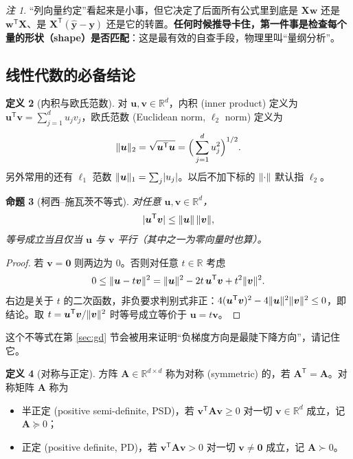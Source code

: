 \documentclass[UTF8,a4paper,11pt]{ctexart}
\theoremstyle{definition}
\newtheorem{definition}{定义}[section]
\theoremstyle{plain}
\newtheorem{proposition}[definition]{命题}
\theoremstyle{remark}
\newtheorem{remark}[definition]{注}
\DeclarePairedDelimiter{\norm}{\lVert}{\rVert}
\DeclarePairedDelimiter{\abs}{\lvert}{\rvert}
\newcommand{\R}{\mathbb{R}}
\newcommand{\T}{^{\mathsf{T}}}
\newcommand{\eng}[1]{\textup{(#1)}}
\begin{document}
\begin{remark}
“列向量约定”看起来是小事，但它决定了后面所有公式里到底是 $\bm{X}\bm{w}$ 还是 $\bm{w}\T\bm{X}$、是 $\bm{X}\T(\hat{\bm{y}}-\bm{y})$ 还是它的转置。\textbf{任何时候推导卡住，第一件事是检查每个量的形状（shape）是否匹配}：这是最有效的自查手段，物理里叫“量纲分析”。
\end{remark}

\subsection{线性代数的必备结论}

\begin{definition}[内积与欧氏范数]
对 $\bm{u},\bm{v}\in\R^{d}$，内积 \eng{inner product} 定义为 $\bm{u}\T\bm{v}=\sum_{j=1}^{d}u_jv_j$，欧氏范数 \eng{Euclidean norm, $\ell_2$ norm} 定义为
\[
  \norm{\bm{u}}_2=\sqrt{\bm{u}\T\bm{u}}=\Big(\sum_{j=1}^d u_j^2\Big)^{1/2}.
\]
另外常用的还有 $\ell_1$ 范数 $\norm{\bm{u}}_1=\sum_j\abs{u_j}$。以后不加下标的 $\norm{\cdot}$ 默认指 $\ell_2$。
\end{definition}

\begin{proposition}[柯西--施瓦茨不等式]\label{prop:cs}
对任意 $\bm{u},\bm{v}\in\R^d$，
\[
  \abs{\bm{u}\T\bm{v}}\le\norm{\bm{u}}\,\norm{\bm{v}},
\]
等号成立当且仅当 $\bm{u}$ 与 $\bm{v}$ 平行（其中之一为零向量时也算）。
\end{proposition}

\begin{proof}
若 $\bm{v}=\bm{0}$ 则两边为 $0$。否则对任意 $t\in\R$ 考虑
\[
  0\le\norm{\bm{u}-t\bm{v}}^2=\norm{\bm{u}}^2-2t\,\bm{u}\T\bm{v}+t^2\norm{\bm{v}}^2 .
\]
右边是关于 $t$ 的二次函数，非负要求判别式非正：$4(\bm{u}\T\bm{v})^2-4\norm{\bm{u}}^2\norm{\bm{v}}^2\le0$，即结论。取 $t=\bm{u}\T\bm{v}/\norm{\bm{v}}^2$ 时等号成立等价于 $\bm{u}=t\bm{v}$。
\end{proof}

这个不等式在第 \ref{sec:gd} 节会被用来证明“负梯度方向是最陡下降方向”，请记住它。

\begin{definition}[对称与正定]
方阵 $\bm{A}\in\R^{d\times d}$ 称为对称 \eng{symmetric} 的，若 $\bm{A}\T=\bm{A}$。对称矩阵 $\bm{A}$ 称为
\begin{itemize}
  \item 半正定 \eng{positive semi-definite, PSD}，若 $\bm{v}\T\bm{A}\bm{v}\ge0$ 对一切 $\bm{v}\in\R^d$ 成立，记 $\bm{A}\succeq0$；
  \item 正定 \eng{positive definite, PD}，若 $\bm{v}\T\bm{A}\bm{v}>0$ 对一切 $\bm{v}\ne\bm{0}$ 成立，记 $\bm{A}\succ0$。
\end{itemize}
\end{definition}
\end{document}
